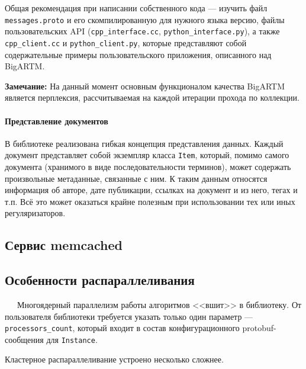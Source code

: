 Общая рекомендация при написании собственного кода --- изучить файл \verb'messages.proto' и его скомпилированную для нужного языка версию, файлы пользовательских API (\verb'cpp_interface.cc', \verb'python_interface.py'), а также \verb'cpp_client.cc' и \verb'python_client.py', которые представляют собой содержательные примеры пользовательского приложения, описанного над BigARTM.

{\bf Замечание:} На данный момент основным функционалом качества BigARTM является перплексия, рассчитываемая на каждой итерации прохода по коллекции.

\paragraph{Представление документов} В библиотеке реализована гибкая концепция представления данных. Каждый документ представляет собой экземпляр класса \verb'Item', который, помимо самого документа (хранимого в виде последовательности терминов), может содержать произвольные метаданные, связанные с ним. К таким данным относятся информация об авторе, дате публикации, ссылках на документ и из него, тегах и т.п. Всё это может оказаться крайне полезным при использовании тех или иных регуляризаторов.

\subsection{Сервис memcached}

\subsection{Особенности распараллеливания}

$\quad\;\:$Многоядерный параллелизм работы алгоритмов <<вшит>> в библиотеку. От пользователя библиотеки требуется указать только один параметр --- \verb'processors_count', который входит в состав конфигурационного protobuf-сообщения для \verb'Instance'.

Кластерное распараллеливание устроено несколько сложнее.
